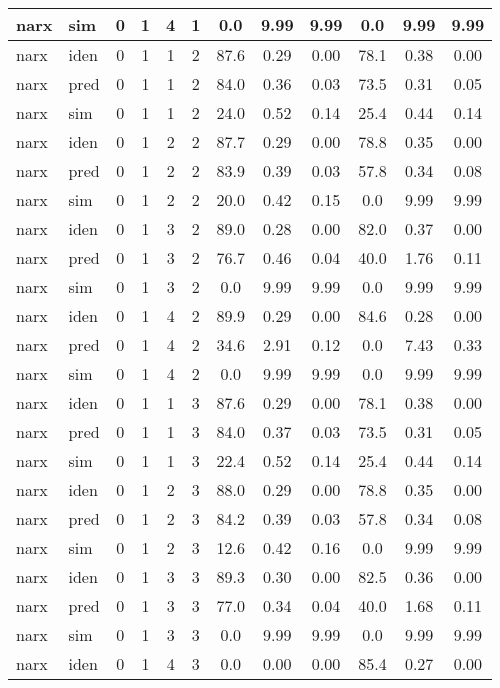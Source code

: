 \begin{center}
\begin{longtable}{ll|cccc|ccc|ccc}
narx & sim & 0 & 1 & 4 & 1 & 0.0 & 9.99 & 9.99 & 0.0 & 9.99 & 9.99 \\ 
 \hline 
narx & iden & 0 & 1 & 1 & 2 & 87.6 & 0.29 & 0.00 & 78.1 & 0.38 & 0.00 \\ 
narx & pred & 0 & 1 & 1 & 2 & 84.0 & 0.36 & 0.03 & 73.5 & 0.31 & 0.05 \\ 
narx & sim & 0 & 1 & 1 & 2 & 24.0 & 0.52 & 0.14 & 25.4 & 0.44 & 0.14 \\ 
 \hline 
narx & iden & 0 & 1 & 2 & 2 & 87.7 & 0.29 & 0.00 & 78.8 & 0.35 & 0.00 \\ 
narx & pred & 0 & 1 & 2 & 2 & 83.9 & 0.39 & 0.03 & 57.8 & 0.34 & 0.08 \\ 
narx & sim & 0 & 1 & 2 & 2 & 20.0 & 0.42 & 0.15 & 0.0 & 9.99 & 9.99 \\ 
 \hline 
narx & iden & 0 & 1 & 3 & 2 & 89.0 & 0.28 & 0.00 & 82.0 & 0.37 & 0.00 \\ 
narx & pred & 0 & 1 & 3 & 2 & 76.7 & 0.46 & 0.04 & 40.0 & 1.76 & 0.11 \\ 
narx & sim & 0 & 1 & 3 & 2 & 0.0 & 9.99 & 9.99 & 0.0 & 9.99 & 9.99 \\ 
 \hline 
narx & iden & 0 & 1 & 4 & 2 & 89.9 & 0.29 & 0.00 & 84.6 & 0.28 & 0.00 \\ 
narx & pred & 0 & 1 & 4 & 2 & 34.6 & 2.91 & 0.12 & 0.0 & 7.43 & 0.33 \\ 
narx & sim & 0 & 1 & 4 & 2 & 0.0 & 9.99 & 9.99 & 0.0 & 9.99 & 9.99 \\ 
 \hline 
narx & iden & 0 & 1 & 1 & 3 & 87.6 & 0.29 & 0.00 & 78.1 & 0.38 & 0.00 \\ 
narx & pred & 0 & 1 & 1 & 3 & 84.0 & 0.37 & 0.03 & 73.5 & 0.31 & 0.05 \\ 
narx & sim & 0 & 1 & 1 & 3 & 22.4 & 0.52 & 0.14 & 25.4 & 0.44 & 0.14 \\ 
 \hline 
narx & iden & 0 & 1 & 2 & 3 & 88.0 & 0.29 & 0.00 & 78.8 & 0.35 & 0.00 \\ 
narx & pred & 0 & 1 & 2 & 3 & 84.2 & 0.39 & 0.03 & 57.8 & 0.34 & 0.08 \\ 
narx & sim & 0 & 1 & 2 & 3 & 12.6 & 0.42 & 0.16 & 0.0 & 9.99 & 9.99 \\ 
 \hline 
narx & iden & 0 & 1 & 3 & 3 & 89.3 & 0.30 & 0.00 & 82.5 & 0.36 & 0.00 \\ 
narx & pred & 0 & 1 & 3 & 3 & 77.0 & 0.34 & 0.04 & 40.0 & 1.68 & 0.11 \\ 
narx & sim & 0 & 1 & 3 & 3 & 0.0 & 9.99 & 9.99 & 0.0 & 9.99 & 9.99 \\ 
 \hline 
narx & iden & 0 & 1 & 4 & 3 & 0.0 & 0.00 & 0.00 & 85.4 & 0.27 & 0.00 \\ 

\end{longtable}
\end{center}
